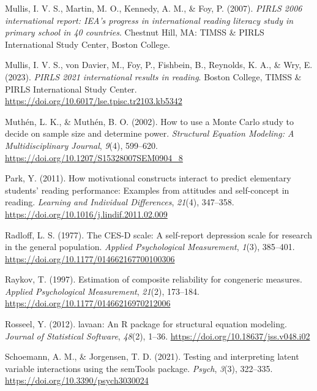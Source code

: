\documentclass[
  man,mask]{apa6}
\newlength{\cslhangindent}
\newenvironment{CSLReferences}[2] %
 {\begin{list}{}{%
  \setlength{\itemindent}{0pt}
  \setlength{\leftmargin}{0pt}
  \setlength{\parsep}{0pt}
  \ifodd #1
   \setlength{\leftmargin}{\cslhangindent}
   \setlength{\itemindent}{-1\cslhangindent}
  \fi
  \setlength{\itemsep}{#2\baselineskip}}}
 {\end{list}}
\begin{document}
\begin{CSLReferences}{1}{0}
Mullis, I. V. S., Martin, M. O., Kennedy, A. M., \& Foy, P. (2007). \emph{PIRLS 2006 international report: IEA's progress in international reading literacy study in primary school in 40 countries}. Chestnut Hill, MA: TIMSS \& PIRLS International Study Center, Boston College.

Mullis, I. V. S., von Davier, M., Foy, P., Fishbein, B., Reynolds, K. A., \& Wry, E. (2023). \emph{PIRLS 2021 international results in reading}. Boston College, TIMSS \& PIRLS International Study Center. \url{https://doi.org/10.6017/lse.tpisc.tr2103.kb5342}

Muthén, L. K., \& Muthén, B. O. (2002). How to use a {Monte Carlo} study to decide on sample size and determine power. \emph{Structural Equation Modeling: A Multidisciplinary Journal}, \emph{9}(4), 599--620. \url{https://doi.org/10.1207/S15328007SEM0904_8}

Park, Y. (2011). How motivational constructs interact to predict elementary students' reading performance: {Examples} from attitudes and self-concept in reading. \emph{Learning and Individual Differences}, \emph{21}(4), 347--358. \url{https://doi.org/10.1016/j.lindif.2011.02.009}

Radloff, L. S. (1977). The {CES-D} scale: {A} self-report depression scale for research in the general population. \emph{Applied Psychological Measurement}, \emph{1}(3), 385--401. \url{https://doi.org/10.1177/014662167700100306}

Raykov, T. (1997). Estimation of composite reliability for congeneric measures. \emph{Applied Psychological Measurement}, \emph{21}(2), 173--184. \url{https://doi.org/10.1177/01466216970212006}

Rosseel, Y. (2012). {lavaan}: An {R} package for structural equation modeling. \emph{Journal of Statistical Software}, \emph{48}(2), 1--36. \url{https://doi.org/10.18637/jss.v048.i02}

Schoemann, A. M., \& Jorgensen, T. D. (2021). Testing and interpreting latent variable interactions using the {semTools} package. \emph{Psych}, \emph{3}(3), 322--335. \url{https://doi.org/10.3390/psych3030024}


\end{CSLReferences}
\end{document}
